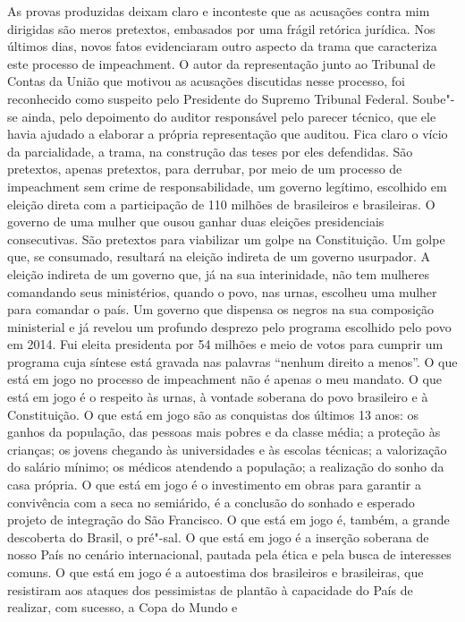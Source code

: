 As provas produzidas deixam claro e inconteste que as acusações contra
mim dirigidas são meros pretextos, embasados por uma frágil retórica
jurídica. Nos últimos dias, novos fatos evidenciaram outro aspecto da
trama que caracteriza este processo de impeachment. O autor da
representação junto ao Tribunal de Contas da União que motivou as
acusações discutidas nesse processo, foi reconhecido como suspeito pelo
Presidente do Supremo Tribunal Federal. Soube"-se ainda, pelo depoimento
do auditor responsável pelo parecer técnico, que ele havia ajudado a
elaborar a própria representação que auditou. Fica claro o vício da
parcialidade, a trama, na construção das teses por eles defendidas. São
pretextos, apenas pretextos, para derrubar, por meio de um processo de
impeachment sem crime de responsabilidade, um governo legítimo,
escolhido em eleição direta com a participação de 110 milhões de
brasileiros e brasileiras. O governo de uma mulher que ousou ganhar duas
eleições presidenciais consecutivas. São pretextos para viabilizar um
golpe na Constituição. Um golpe que, se consumado, resultará na eleição
indireta de um governo usurpador. A eleição indireta de um governo que,
já na sua interinidade, não tem mulheres comandando seus ministérios,
quando o povo, nas urnas, escolheu uma mulher para comandar o país. Um
governo que dispensa os negros na sua composição ministerial e já
revelou um profundo desprezo pelo programa escolhido pelo povo em 2014.
Fui eleita presidenta por 54 milhões e meio de votos para cumprir um
programa cuja síntese está gravada nas palavras ``nenhum direito a
menos''. O que está em jogo no processo de impeachment não é apenas o
meu mandato. O que está em jogo é o respeito às urnas, à vontade
soberana do povo brasileiro e à Constituição. O que está em jogo são as
conquistas dos últimos 13 anos: os ganhos da população, das pessoas mais
pobres e da classe média; a proteção às crianças; os jovens chegando às
universidades e às escolas técnicas; a valorização do salário mínimo; os
médicos atendendo a população; a realização do sonho da casa própria. O
que está em jogo é o investimento em obras para garantir a convivência
com a seca no semiárido, é a conclusão do sonhado e esperado projeto de
integração do São Francisco. O que está em jogo é, também, a grande
descoberta do Brasil, o pré"-sal. O que está em jogo é a inserção
soberana de nosso País no cenário internacional, pautada pela ética e
pela busca de interesses comuns. O que está em jogo é a autoestima dos
brasileiros e brasileiras, que resistiram aos ataques dos pessimistas de
plantão à capacidade do País de realizar, com sucesso, a Copa do Mundo e
